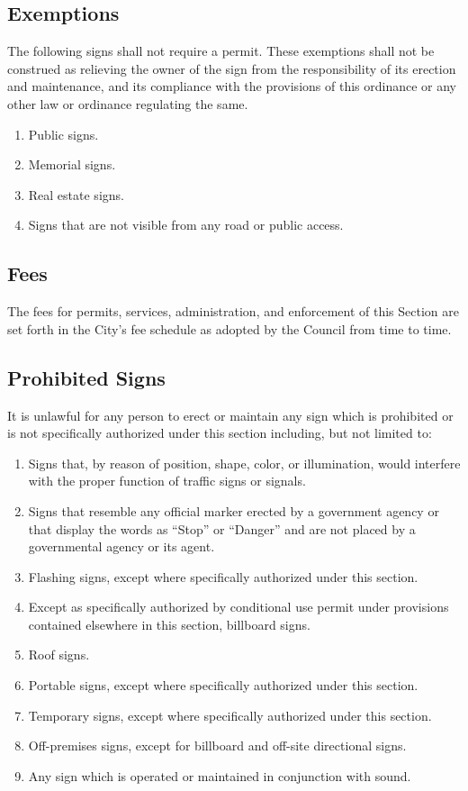 \subsection{Exemptions}
The following signs shall not require a permit.  These exemptions shall not be construed as relieving the owner of the sign from the responsibility of its erection and maintenance, and its compliance with the provisions of this ordinance or any other law or ordinance regulating the same.
\begin{enumerate}[{\indent}1)]
    \item Public signs.
    \item Memorial signs.
    \item Real estate signs.
    \item Signs that are not visible from any road or public access.
\end{enumerate}
\subsection{Fees}
The fees for permits, services, administration, and enforcement of this Section are set forth in the City’s fee schedule as adopted by the Council from time to time.
\subsection{Prohibited Signs}
It is unlawful for any person to erect or maintain any sign which is prohibited or is not specifically authorized under this section including, but not limited to:
\begin{enumerate}[{\indent}1)]
    \item Signs that, by reason of position, shape, color, or illumination, would interfere with the proper function of traffic signs or signals.
    \item Signs that resemble any official marker erected by a government agency or that display the words as “Stop” or “Danger” and are not placed by a governmental agency or its agent.
    \item Flashing signs, except where specifically authorized under this section.
    \item Except as specifically authorized by conditional use permit under provisions contained elsewhere in this section, billboard signs.
    \item Roof signs.
    \item Portable signs, except where specifically authorized under this section.
    \item Temporary signs, except where specifically authorized under this section.
    \item Off-premises signs, except for billboard and off-site directional signs.
    \item Any sign which is operated or maintained in conjunction with sound.
\end{enumerate}
